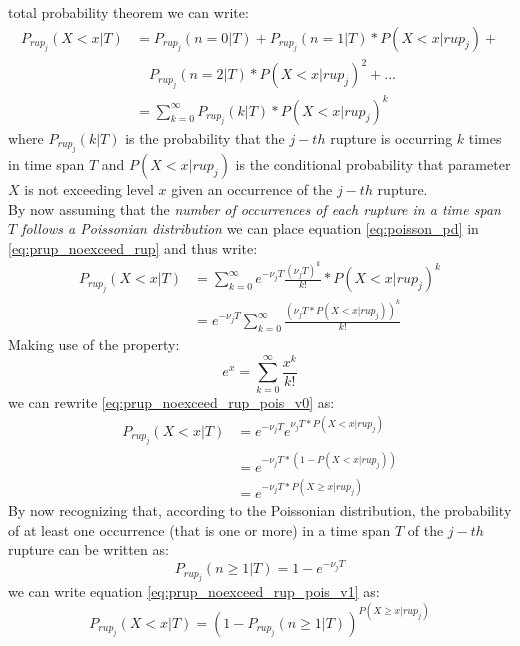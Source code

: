 total probability theorem we can write:
\begin{align}
\label{eq:prup_noexceed_rup}
P_{rup_{j}}(X < x | T) & = P_{rup_{j}}(n = 0 | T) + P_{rup_{j}}(n = 1 | T) * P(X < x | rup_{j}) + \nonumber \\
                                &\quad	P_{rup_{j}}(n = 2 | T) * P(X < x | rup_{j})^{2}  + ... \nonumber \\
				 & = \sum_{k=0}^{\infty} P_{rup_{j}}(k | T) * P(X < x | rup_{j}) ^ {k} 
\end{align}
where $P_{rup_{j}}(k | T)$ is the probability that the $j-th$ rupture is occurring $k$ times in time span $T$ and
$P(X < x | rup_{j})$ is the conditional probability that parameter $X$ is not exceeding level $x$ given an
occurrence of the $j-th$ rupture.\\
By now assuming that the \textit{number of occurrences of each rupture in a time span $T$ follows a Poissonian distribution}
we can place equation \ref{eq:poisson_pd} in \ref{eq:prup_noexceed_rup} and thus write:
\begin{align}
\label{eq:prup_noexceed_rup_pois_v0}
P_{rup_{j}}(X < x | T) & = \sum_{k=0}^{\infty} e^{-\nu_{j} T} \frac{(\nu_{j} T) ^ {k}}{k!} * P(X < x | rup_{j}) ^ {k} \nonumber \\
				 & =  e^{-\nu_{j} T} \sum_{k=0}^{\infty} \frac{(\nu_{j} T * P(X < x | rup_{j})) ^ {k}}{k!}
\end{align}
Making use of the property:
\begin{equation}
e^{x} = \sum_{k=0} ^ {\infty} \frac{x^{k}}{k!}
\end{equation}
we can rewrite \ref{eq:prup_noexceed_rup_pois_v0} as:
\begin{align}
\label{eq:prup_noexceed_rup_pois_v1}
P_{rup_{j}}(X < x | T) & = e^{-\nu_{j} T} e ^ {\nu_{j} T * P(X < x | rup_{j})} \nonumber \\
				 & = e^{-\nu_{j} T * (1 - P(X < x | rup_{j}))} \nonumber \\
				 & = e^{-\nu_{j} T * P(X \ge x | rup_{j})}
\end{align}
By now recognizing that, according to the Poissonian distribution, the probability of at least one occurrence
(that is one or more) in a time span $T$ of the $j-th$ rupture can be written as:
\begin{equation}
P_{rup_{j}}(n \ge 1 | T) = 1 -  e^{-\nu_{j} T}
\end{equation}
we can write equation \ref{eq:prup_noexceed_rup_pois_v1} as:
\begin{equation}
\label{eq:prup_noexceed_rup_pois_v2}
P_{rup_{j}}(X < x | T) = (1 - P_{rup_{j}}(n \ge 1 | T))^{P(X \ge x | rup_{j})}
\end{equation}
